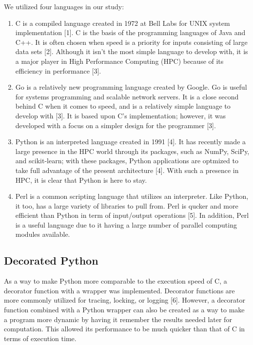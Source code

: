 \documentclass{sig-alternate}
\begin{document}
We utilized four languages in our study:

\begin{enumerate}
\item {\em}C is a compiled language created in 1972 at Bell Labs for UNIX system implementation [1]. C is the basis of the programming languages of Java and C++. It is often chosen when speed is a priority for inputs consisting of large data sets [2]. Although it isn't the most simple language to develop with, it is a major player in High Performance Computing (HPC) because of its efficiency in performance [3].
\item {\em}Go is a relatively new programming language created by Google. Go is useful for systems programming and scalable network servers. It is a close second behind C when it comes to speed, and is a relatively simple language to develop with [3]. It is based upon C's implementation; however, it was developed with a focus on a simpler design for the programmer [3]. 
\item {\em}Python is an interpreted language created in 1991 [4]. It has recently made a large presence in the HPC world through its packages, such as NumPy, SciPy, and scikit-learn; with these packages, Python applications are optmized to take full advantage of the present architecture [4]. With such a presence in HPC, it is clear that Python is here to stay.
\item  {\em}Perl is a common scripting language that utilizes an interpreter. Like Python, it too, has a large variety of libraries to pull from. Perl is qucker and more efficient than Python in term of input/output operations [5]. In addition, Perl is a useful language due to it having a large number of parallel computing modules available.
\end{enumerate}


\subsection{Decorated Python}

As a way to make Python more comparable to the execution speed of C, a decorator function with a wrapper was implemented. Decorator functions are more commonly utilized for tracing, locking, or logging [6]. However, a decorator function combined with a Python wrapper can also be created as a way to make a program more dynamic by having it remember the results needed later for computation. This allowed its performance to be much quicker than that of C in terms of execution time.
\end{document}
